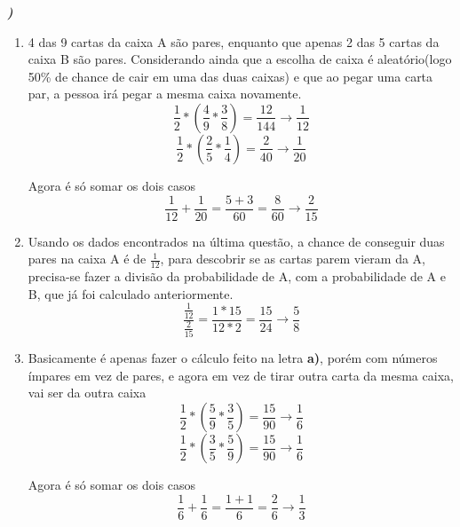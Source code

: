 \documentclass[12pt]{article}
\newcounter{instn}
\newcommand{\instnum}{\arabic{instn}}
\newcommand{\myline}[1]{
    \emph{\textbf{#1)}}
    \addtocounter{instn}{1}
}
\newenvironment{question}
 {
    \myline{\instnum} 
    }
    {
 }
\begin{document}
    \begin{question}

        \begin{enumerate}[label={\textbf{\alph*)}}]
            \item 4 das 9 cartas da caixa A são pares, enquanto que apenas 2 das 5 cartas da caixa B são pares.
            Considerando ainda que a escolha de caixa é aleatório(logo 50\% de chance de cair em uma das duas caixas) e 
            que ao pegar uma carta par, a pessoa irá pegar a mesma caixa novamente.
            \[
                \frac{1}{2}*(\frac{4}{9} * \frac{3}{8}) = \frac{12}{144} \rightarrow \frac{1}{12}
            \]
            \[
                \frac{1}{2}*(\frac{2}{5} * \frac{1}{4}) = \frac{2}{40} \rightarrow \frac{1}{20}
            \]

            Agora é só somar os dois casos 
            \begin{equation}
                \frac{1}{12} + \frac{1}{20} = \frac{5+3}{60} = \frac{8}{60} \rightarrow \frac{2}{15}
            \end{equation}
            \item Usando os dados encontrados na última questão, a chance de conseguir duas pares na caixa A é de 
            $\frac{1}{12}$, para descobrir se as cartas parem vieram da A, precisa-se fazer a divisão da probabilidade de A,
            com a probabilidade de A e B, que já foi calculado anteriormente.
            \begin{equation}
                \frac{\frac{1}{12}}{\frac{2}{15}} = \frac{1 * 15}{12 * 2} = \frac{15}{24} \rightarrow \frac{5}{8}
            \end{equation}

            \item Basicamente é apenas fazer o cálculo feito na letra \textbf{a)}, porém com números ímpares em vez de pares, e agora 
            em vez de tirar outra carta da mesma caixa, vai ser da outra caixa 
            \[
                \frac{1}{2}*(\frac{5}{9} * \frac{3}{5}) = \frac{15}{90} \rightarrow \frac{1}{6}
            \]
            \[
                \frac{1}{2}*(\frac{3}{5} * \frac{5}{9}) = \frac{15}{90} \rightarrow \frac{1}{6}
            \]

            Agora é só somar os dois casos 
            \begin{equation}
                \frac{1}{6} + \frac{1}{6} = \frac{1+1}{6} = \frac{2}{6} \rightarrow \frac{1}{3}
            \end{equation}
               
        \end{enumerate}
    \end{question}
\end{document}
